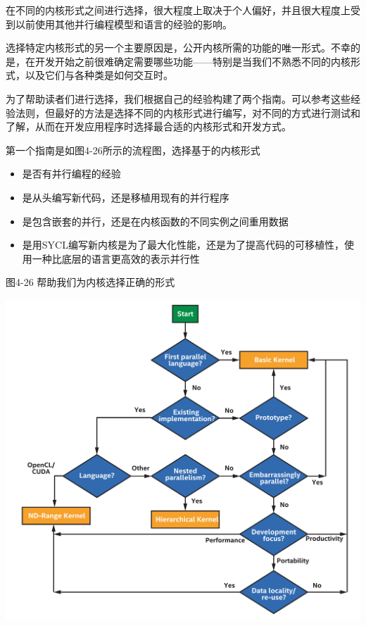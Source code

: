 在不同的内核形式之间进行选择，很大程度上取决于个人偏好，并且很大程度上受到以前使用其他并行编程模型和语言的经验的影响。\par

选择特定内核形式的另一个主要原因是，公开内核所需的功能的唯一形式。不幸的是，在开发开始之前很难确定需要哪些功能——特别是当我们不熟悉不同的内核形式，以及它们与各种类是如何交互时。\par

为了帮助读者们进行选择，我们根据自己的经验构建了两个指南。可以参考这些经验法则，但最好的方法是选择不同的内核形式进行编写，对不同的方式进行测试和了解，从而在开发应用程序时选择最合适的内核形式和开发方式。\par

第一个指南是如图4-26所示的流程图，选择基于的内核形式\par

\begin{itemize}
	\item 是否有并行编程的经验
	\item 是从头编写新代码，还是移植用现有的并行程序
	\item 是包含嵌套的并行，还是在内核函数的不同实例之间重用数据
	\item 是用SYCL编写新内核是为了最大化性能，还是为了提高代码的可移植性，使用一种比底层的语言更高效的表示并行性
\end{itemize}

\hspace*{\fill} \par %
图4-26 帮助我们为内核选择正确的形式
\begin{center}
	\includegraphics[width=1.\textwidth]{content/chapter-4/images/7}
\end{center}

